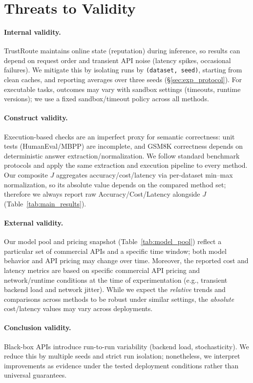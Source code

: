 \documentclass[acmsmall,screen,review,anonymous]{acmart}
\begin{document}
\section{Threats to Validity}
\label{sec:threats}

\paragraph{Internal validity.}
TrustRoute maintains online state (reputation) during inference, so results can depend on request order and transient API noise (latency spikes, occasional failures).
We mitigate this by isolating runs by \texttt{(dataset, seed)}, starting from clean caches, and reporting averages over three seeds (\S\ref{sec:exp_protocol}).
For executable tasks, outcomes may vary with sandbox settings (timeouts, runtime versions); we use a fixed sandbox/timeout policy across all methods.

\paragraph{Construct validity.}
Execution-based checks are an imperfect proxy for semantic correctness: unit tests (HumanEval/MBPP) are incomplete, and GSM8K correctness depends on deterministic answer extraction/normalization.
We follow standard benchmark protocols and apply the same extraction and execution pipeline to every method.
Our composite $J$ aggregates accuracy/cost/latency via per-dataset min--max normalization, so its absolute value depends on the compared method set; therefore we always report raw Accuracy/Cost/Latency alongside $J$ (Table~\ref{tab:main_results}).

\paragraph{External validity.}
Our model pool and pricing snapshot (Table~\ref{tab:model_pool}) reflect a particular set of commercial APIs and a specific time window; both model behavior and API pricing may change over time.
Moreover, the reported cost and latency metrics are based on specific commercial API pricing and network/runtime conditions at the time of experimentation (e.g., transient backend load and network jitter).
While we expect the \emph{relative} trends and comparisons across methods to be robust under similar settings, the \emph{absolute} cost/latency values may vary across deployments.

\paragraph{Conclusion validity.}
Black-box APIs introduce run-to-run variability (backend load, stochasticity).
We reduce this by multiple seeds and strict run isolation; nonetheless, we interpret improvements as evidence under the tested deployment conditions rather than universal guarantees.
\end{document}
